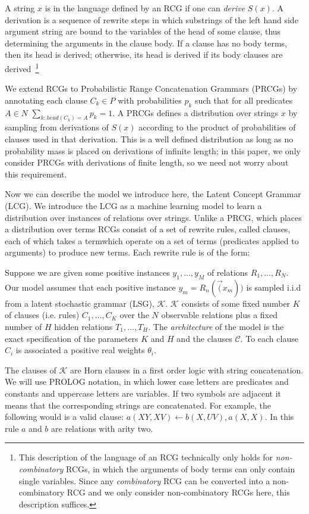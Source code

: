 \documentclass[11pt, twocolumn]{article}
\begin{document}
A string $x$ is in the language defined by an RCG if one can
\emph{derive} $S(x)$. A derivation is a sequence of rewrite steps in
which substrings of the left hand side argument string are bound to
the variables of the head of some clause, thus determining the
arguments in the clause body. If a clause has no body terms, then its
head is derived; otherwise, its head is derived if its body clauses
are derived~\footnote{This description of the language of an RCG
  technically only holds for \emph{non-combinatory} RCGs, in which the
  arguments of body terms can only contain single variables. Since any
  \emph{combinatory} RCG can be converted into a non-combinatory RCG
  and we only consider non-combinatory RCGs here, this description
  suffices.}

We extend RCGs to Probabilistic Range Concatenation Grammars (PRCGs)
by annotating each clause $C_k \in P$ with probabilities $p_k$ such
that for all predicates $A \in N$ $\sum_{k:head(C_k)=A} p_k = 1$. A
PRCGs defines a distribution over strings $x$ by sampling from
derivations of $S(x)$ according to the product of probabilities of
clauses used in that derivation. This is a well defined distribution
as long as no probability mass is placed on derivations of infinite
length; in this paper, we only consider PRCGs with derivations of
finite length, so we need not worry about this requirement.

Now we can describe the model we introduce here, the Latent Concept
Grammar (LCG). We introduce the LCG as a machine learning model to
learn a distribution over instances of relations over strings. Unlike
a PRCG, which places a distribution over terms RCGs consist of a set
of rewrite rules, called clauses, each of which takes a termwhich
operate on a set of terms (predicates applied to arguments) to produce
new terms. Each rewrite rule is of the form:

Suppose we are given some positive instances $y_1, \dots,
y_M$ of relations $R_1, \dots, R_N$. Our model assumes that each
positive instance $y_m=R_n(\vec(x_m))$ is sampled i.i.d from a latent
stochastic grammar (LSG), $\mathcal{K}$. $\mathcal{K}$ consists of
some fixed number $K$ of clauses (i.e. rules) $C_1, \dots, C_K$ over
the $N$ observable relations plus a fixed number of $H$ hidden
relations $T_1, \dots, T_H$. The \emph{architecture} of the model is
the exact specification of the parameters $K$ and $H$ and the clauses
$\mathcal{C}$. To each clause $C_i$ is associated a positive real
weights $\theta_i$.

The clauses of $\mathcal{K}$ are Horn clauses in a first order logic
with string concatenation. We will use PROLOG notation, in which lower
case letters are predicates and constants and uppercase letters are
variables. If two symbols are adjacent it means that the corresponding
strings are concatenated. For example, the following would is a valid
clause: $a(XY, XV) \leftarrow b(X, UV), a(X, X)$. In this rule $a$ and
$b$ are relations with arity two.
\end{document}
